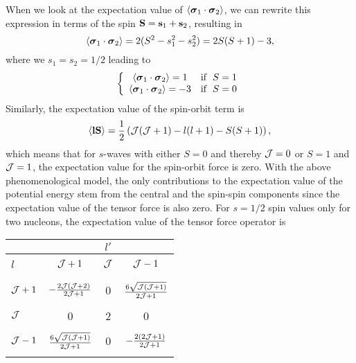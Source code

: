 \begin{enumerate}
When we look at the expectation value of 
$\langle \mbox{\boldmath $\sigma$}_1\cdot\mbox{\boldmath $\sigma$}_2\rangle$, we can rewrite this expression in terms of the
spin ${\bf S}={\bf s}_1+{\bf s}_2$, resulting in 
\[
\langle\mbox{\boldmath $\sigma$}_1\cdot\mbox{\boldmath $\sigma$}_2\rangle=2(S^2-s_1^2-s_2^2)=2S(S+1)-3,
\]
where we $s_1=s_2=1/2$ leading to
\[
\left\{ \begin{array}{cc} \langle\mbox{\boldmath $\sigma$}_1\cdot\mbox{\boldmath $\sigma$}_2\rangle=1 &  \mathrm{if} \hspace{0.2cm} S=1\\
\langle\mbox{\boldmath $\sigma$}_1\cdot\mbox{\boldmath $\sigma$}_2\rangle=-3 & \mathrm{if} \hspace{0.2cm} S=0\\\end{array}\right.
\]
Similarly, the expectation value of the spin-orbit term is 
\[
\langle {\bf l}{\bf S} \rangle = \frac{1}{2}\left( {\cal J}({\cal J}+1)-l(l+1)-S(S+1)\right),
\]
which means that for $s$-waves with either $S=0$ and thereby ${\cal J}=0$ or $S=1$ and ${\cal J}=1$, the expectation value for the
spin-orbit force is zero. With the above phenomenological model, the
only contributions to the expectation value of the potential energy
stem from the central and the spin-spin components since the
expectation value of the tensor force is also zero. For $s=1/2$ spin
values only for two nucleons, the expectation value of the tensor
force operator is
\begin{table}[hbtp]
\begin{center}
\begin{tabular}{lccc} 
& & $l'$  &  \\ \hline
 & & & \\ 
$l$  & ${\cal J}+1$    & ${\cal J}$  & ${\cal J}-1$  \\ & & & \\  \hline 
& & & \\ 
${\cal J}+1$ & $-\frac{2{\cal J}({\cal J}+2)}{2{\cal J}+1}$  &0  &$\frac{6\sqrt{{\cal J}({\cal J}+1)}}{2{\cal J}+1}$   \\ 
& & & \\ 
${\cal J}$&  0      &2      &    0     \\ 
& & & \\ 
${\cal J}-1$& $\frac{6\sqrt{{\cal J}({\cal J}+1)}}{2{\cal J}+1}$       & 0     & $-\frac{2(2{\cal J}+1)}{2{\cal J}+1}$        \\
& & & \\ \hline 
\end{tabular}
\end{center}
\end{table}



\end{enumerate}
